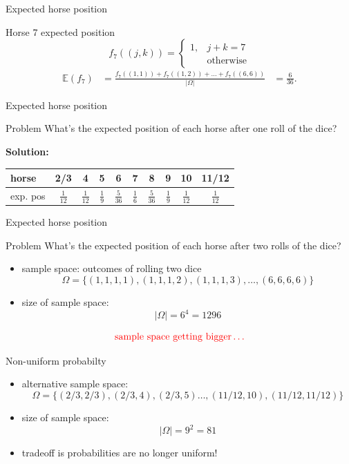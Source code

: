 \documentclass{beamer}
\begin{document}
\begin{frame}{Expected horse position}
  \begin{block}{Horse 7 expected position}
    $$f_{7}((j,k)) = \left\lbrace\begin{array}{cc}1, & j+k=7\\ & \text{otherwise}\end{array}\right.$$
    \begin{align*}
      \mathbb{E}(f_{7})
        & = \frac{f_{7}((1,1))+f_{7}((1,2))+\dots+f_{7}((6,6))}{|\Omega|}
        & = \frac{6}{36}.
    \end{align*}
  \end{block}
\end{frame}

\begin{frame}{Expected horse position}
  \begin{block}{Problem}
    What's the expected position of each horse after one roll of the dice?
  \end{block}
  \textbf{Solution:}
  \begin{center}
    \begin{tabular}{l|c|c|c|c|c|c|c|c|c|}
      horse    & 2/3 & 4 & 5 & 6 & 7 & 8 & 9 & 10 & 11/12\\\hline
      exp. pos & $\frac{1}{12}$ & $\frac{1}{12}$ & $\frac{1}{9}$ & $\frac{5}{36}$ & $\frac{1}{6}$ & $\frac{5}{36}$ & $\frac{1}{9}$ & $\frac{1}{12}$ & $\frac{1}{12}$
    \end{tabular}
  \end{center}
\end{frame}

\begin{frame}{Expected horse position}
  \begin{block}{Problem}
    What's the expected position of each horse after two rolls of the dice?
  \end{block}
    \begin{itemize}
\pause
      \item sample space: outcomes of rolling two dice
    $$\Omega = \{(1,1,1,1),(1,1,1,2),(1,1,1,3),\dots, (6,6,6,6)\}$$
\pause
      \item size of sample space:
    $$|\Omega| = 6^4 = 1296$$
    \end{itemize}
\pause
    $${\color{red}\text{sample space getting bigger}\dots}$$
\end{frame}

\begin{frame}{Non-uniform probabilty}
    \begin{itemize}
\pause
     \item alternative sample space:
  $$\Omega = \{(2/3,2/3),(2/3,4),(2/3, 5)\dots, (11/12,10), (11/12,11/12)\}$$
\pause
      \item size of sample space:
    $$|\Omega| = 9^2 = 81$$
\pause
      \item tradeoff is probabilities are no longer uniform!
  \end{itemize}
\end{frame}
\end{document}
